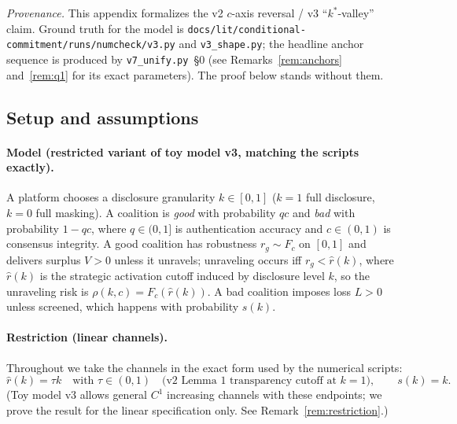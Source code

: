 
{\sloppy
\noindent\emph{Provenance.} This appendix formalizes the v2 $c$-axis reversal / v3
``$k^*$-valley'' claim. Ground truth for the model is
\texttt{docs/lit/conditional-commitment/}\allowbreak\texttt{runs/numcheck/v3.py} and
\texttt{v3\_shape.py}; the headline anchor sequence is produced by
\texttt{v7\_unify.py}~\S0 (see Remarks~\ref{rem:anchors} and~\ref{rem:q1} for its exact
parameters). The proof below stands without them.\par}

\subsection*{Setup and assumptions}

\paragraph{Model (restricted variant of toy model v3, matching the scripts exactly).}
A platform chooses a disclosure granularity $k \in [0,1]$ ($k = 1$ full disclosure,
$k = 0$ full masking). A coalition is \emph{good} with probability $qc$ and \emph{bad}
with probability $1 - qc$, where $q \in (0,1]$ is authentication accuracy and
$c \in (0,1)$ is consensus integrity. A good coalition has robustness $r_g \sim F_c$ on
$[0,1]$ and delivers surplus $V > 0$ unless it unravels; unraveling occurs iff
$r_g < \hat r(k)$, where $\hat r(k)$ is the strategic activation cutoff induced by
disclosure level $k$, so the unraveling risk is $\rho(k,c) = F_c(\hat r(k))$. A bad
coalition imposes loss $L > 0$ unless screened, which happens with probability $s(k)$.

\paragraph{Restriction (linear channels).} Throughout we take the channels in the exact
form used by the numerical scripts:
\[
\hat r(k) = \tau k \quad \text{with } \tau \in (0,1)
\quad \text{(v2 Lemma~1 transparency cutoff at $k = 1$)},
\qquad
s(k) = k.
\]
(Toy model v3 allows general $C^1$ increasing channels with these endpoints; we prove
the result for the linear specification only. See Remark~\ref{rem:restriction}.)

